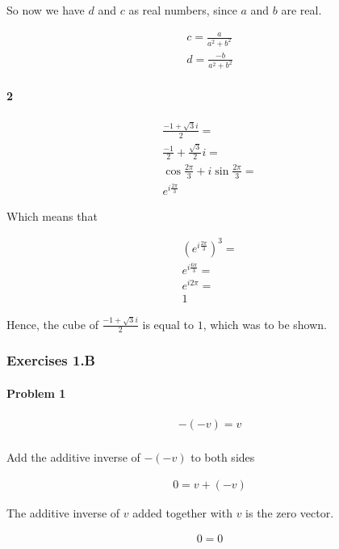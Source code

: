 So now we have $d$ and $c$ as real numbers, since $a$ and $b$ are real.

\begin{align*}
	c = \frac{a}{a^2+b^2} \\
	d = \frac{-b}{a^2+b^2}
\end{align*}

\paragraph{2}

\begin{align*}
	\frac{-1+\sqrt{3}i}{2} = \\
	\frac{-1}{2} + \frac{\sqrt{3}}{2}i = \\
	\cos \frac{2\pi}{3} + i\sin \frac{2\pi}{3} = \\
	e^{i\frac{2\pi}{3}}
\end{align*}

Which means that 

\begin{align*}
	\left( e^{i\frac{2\pi}{3}} \right)^3 = \\
	e^{i\frac{6\pi}{3}} = \\
	e^{i2\pi} = \\
	1
\end{align*}

Hence, the cube of $\frac{-1+\sqrt{3}i}{2}$ is equal to $1$, which was to be shown.

\subsubsection{Exercises 1.B}

\paragraph{Problem 1}

\begin{align*}
	-(-v) = v \\
\end{align*}

Add the additive inverse of $-(-v)$ to both sides

\begin{align*}
	0 = v+(-v)
\end{align*}

The additive inverse of $v$ added together with $v$ is the zero vector.

\begin{align*}
	0 = 0
\end{align*}

